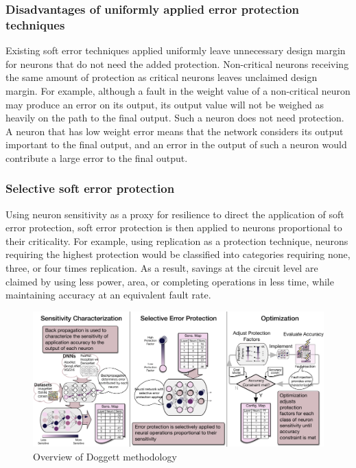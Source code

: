 \subsubsection{Disadvantages of uniformly applied error protection techniques}

Existing soft error techniques applied uniformly leave unnecessary design margin for neurons that do not need the added protection.
Non-critical neurons receiving the same amount of protection as critical neurons leaves unclaimed design margin.
For example, although a fault in the weight value of a non-critical neuron may produce an error on its output, its output value will not be weighed as heavily on the path to the final output.
Such a neuron does not need protection.
A neuron that has low weight error means that the network considers its output important to the final output, and an error in the output of such a neuron would contribute a large error to the final output.

\subsubsection{Selective soft error protection}

Using neuron sensitivity as a proxy for resilience to direct the application of soft error protection, soft error protection is then applied to neurons proportional to their criticality.
For example, using replication as a protection technique, neurons requiring the highest protection would be classified into categories requiring none, three, or four times replication.
As a result, savings at the circuit level are claimed by using less power, area, or completing operations in less time, while maintaining accuracy at an equivalent fault rate.

\begin{figure}
    \centering
    \includegraphics[width=\linewidth]{figs/DoggettOverview.pdf}
    \caption{Overview of Doggett methodology}
    \label{fig:fault_injection_overview}
\end{figure}

